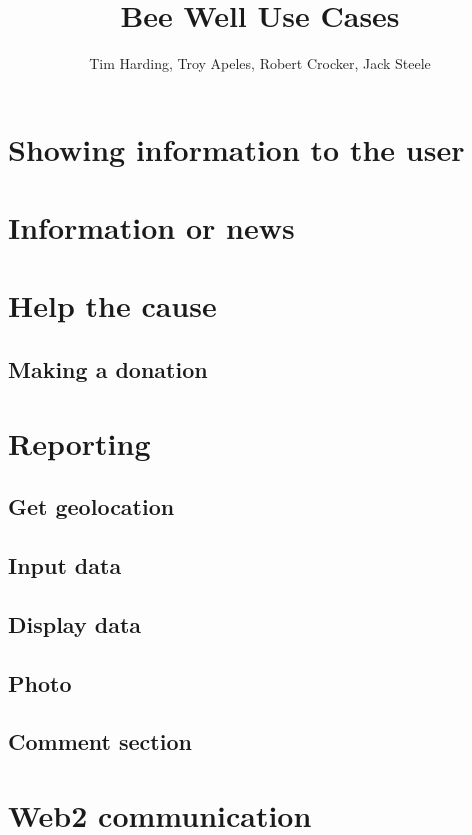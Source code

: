 \documentclass[12pt]{article}
\title{Bee Well Use Cases}
\author{Tim Harding, Troy Apeles, Robert Crocker, Jack Steele}
\begin{document}
\maketitle
\section{Showing information to the user}

\section{Information or news}

\section{Help the cause}
\subsection{Making a donation}

\section{Reporting}
\subsection{Get geolocation}
\subsection{Input data}
\subsection{Display data}
\subsection{Photo}
\subsection{Comment section}

\section{Web2 communication}
\end{document}
